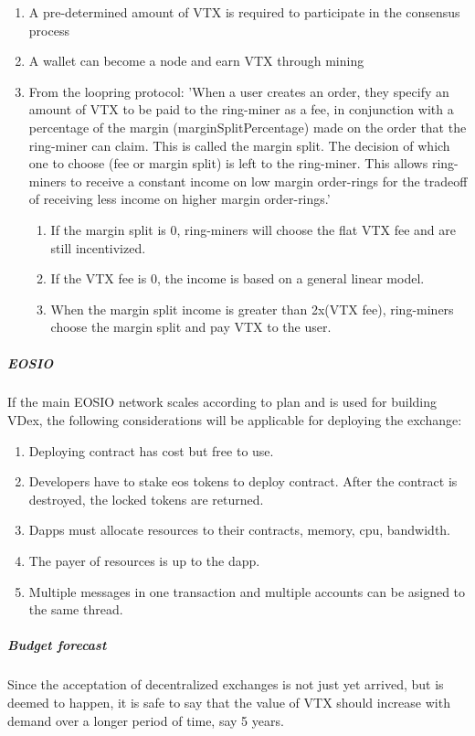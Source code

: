 \documentclass[]{article}
\begin{document}
\begin{enumerate}
\item A pre-determined amount of VTX is required to participate in the consensus process
\item A wallet can become a node and earn VTX through mining
\item From the loopring protocol:
'When a user creates an order, they specify an amount of VTX to be paid to the ring-miner as a fee, in conjunction with a percentage of the margin (marginSplitPercentage) made on the order that the ring-miner can claim. This is
called the margin split. The decision of which one to choose
(fee or margin split) is left to the ring-miner.
This allows ring-miners to receive a constant income on 
low margin order-rings for the tradeoff of receiving less 
income on higher margin order-rings.'
\begin{enumerate}
	\item If the margin split is 0, ring-miners will choose the flat VTX fee and are still incentivized.
	
	\item If the VTX fee is 0, the income is based on a general linear model.
	
	\item When the margin split income is greater than 2x(VTX fee), ring-miners choose the margin split and pay VTX to the user. 
\end{enumerate}	
\end{enumerate}


\subparagraph{EOSIO}
If the main EOSIO network scales according to plan and is used for building VDex, the following considerations will be applicable for deploying the exchange:
\begin{enumerate}
\item Deploying contract has cost but free to use. 
\item Developers have to stake eos tokens to deploy contract.
After the contract is destroyed, the locked tokens are returned.
\item Dapps must allocate resources to their contracts, memory, cpu, bandwidth. 
\item The payer of resources is up to the dapp.
\item Multiple messages in one transaction and multiple accounts can be asigned to the same thread.

\end{enumerate}

\subparagraph{Budget forecast}
Since the acceptation of decentralized exchanges is not just yet arrived,
but is deemed to happen, it is safe to say that the value of VTX should increase with demand over a longer period of time, say 5 years.
\end{document}
